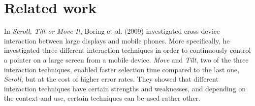\section{Related work} \label{sec:relatedwork}

In \textit{Scroll, Tilt or Move It}, Boring et al. (2009)  investigated cross device interaction between large displays and mobile phones. More specifically, he investigated three different interaction techniques in order to continuously control a pointer on a large screen from a mobile device. \textit{Move} and \textit{Tilt}, two of the three interaction techniques, enabled faster selection time compared to the last one, \textit{Scroll}, but at the cost of higher error rates. They showed that different interaction techniques have certain strengths and weaknesses, and depending on the context and use, certain techniques can be used rather other. 